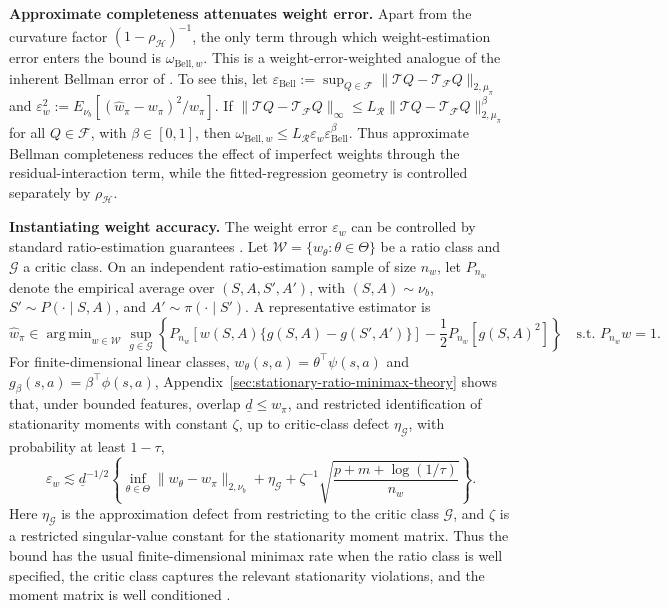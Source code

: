 \documentclass{article}
\DeclareMathOperator*{\argmin}{arg\,min}
\theoremstyle{plain}
\theoremstyle{definition}
\theoremstyle{remark}
\begin{document}
\textbf{Approximate completeness attenuates weight error.}
Apart from the curvature factor \((1-\rho_{\mathcal H})^{-1}\), the only term
through which weight-estimation error enters the bound is
\(\omega_{\mathrm{Bell},w}\). This is a weight-error-weighted analogue of the
inherent Bellman error of \citet{munos2008finite}. To see this, let
\(\varepsilon_{\mathrm{Bell}}
:=\sup_{Q\in\mathcal F}
\|\mathcal TQ-\mathcal T_{\mathcal F}Q\|_{2,\mu_\pi}\) and
\(\varepsilon_w^2:=E_{\nu_b}[(\widehat w_\pi-w_\pi)^2/w_\pi]\). If
\(\|\mathcal TQ-\mathcal T_{\mathcal F}Q\|_\infty
\le
L_{\mathcal R}
\|\mathcal TQ-\mathcal T_{\mathcal F}Q\|_{2,\mu_\pi}^{\beta}\) for all
\(Q\in\mathcal F\), with \(\beta\in[0,1]\), then $\omega_{\mathrm{Bell},w}
\le
L_{\mathcal R}\varepsilon_w\varepsilon_{\mathrm{Bell}}^\beta .$ Thus approximate Bellman completeness reduces the effect of imperfect weights
through the residual-interaction term, while the fitted-regression geometry is
controlled separately by \(\rho_{\mathcal H}\).

\textbf{Instantiating weight accuracy.}
The weight error \(\varepsilon_w\) can be controlled by standard
ratio-estimation guarantees
\citep{uehara2020minimax,uehara2021finite}. Let
\(\mathcal W=\{w_\theta:\theta\in\Theta\}\) be a ratio class and
\(\mathcal G\) a critic class. On an independent ratio-estimation sample of
size \(n_w\), let \(P_{n_w}\) denote the empirical average over
\((S,A,S',A')\), with \((S,A)\sim\nu_b\), \(S'\sim P(\cdot\mid S,A)\), and
\(A'\sim\pi(\cdot\mid S')\). A representative estimator is
\[
\widehat w_\pi
\in
\argmin_{w\in\mathcal W}\sup_{g\in\mathcal G}
\left\{
P_{n_w}\!\left[
w(S,A)\{g(S,A)-g(S',A')\}
\right]
-\frac12 P_{n_w}\!\left[g(S,A)^2\right]
\right\}
\quad
\text{s.t. } P_{n_w}w=1 .
\]
For finite-dimensional linear classes,
\(w_\theta(s,a)=\theta^\top\psi(s,a)\) and
\(g_\beta(s,a)=\beta^\top\phi(s,a)\),
Appendix~\ref{sec:stationary-ratio-minimax-theory} shows that, under bounded
features, overlap \(\underline d\le w_\pi\), and restricted identification of
stationarity moments with constant \(\zeta\), up to critic-class defect
\(\eta_{\mathcal G}\), with probability at least \(1-\tau\),
\[
\varepsilon_w
\lesssim
\underline d^{-1/2}
\left\{
\inf_{\theta\in\Theta}\|w_\theta-w_\pi\|_{2,\nu_b}
+\eta_{\mathcal G}
+\zeta^{-1}\sqrt{\frac{p+m+\log(1/\tau)}{n_w}}
\right\}.
\]
Here \(\eta_{\mathcal G}\) is the approximation defect from restricting to the
critic class \(\mathcal G\), and \(\zeta\) is a restricted singular-value
constant for the stationarity moment matrix. Thus the bound has the usual
finite-dimensional minimax rate when the ratio class is well specified, the
critic class captures the relevant stationarity violations, and the moment
matrix is well conditioned
\citep{dikkala2020minimax,uehara2020minimax,uehara2021finite,bennett2023minimax}.
\end{document}
